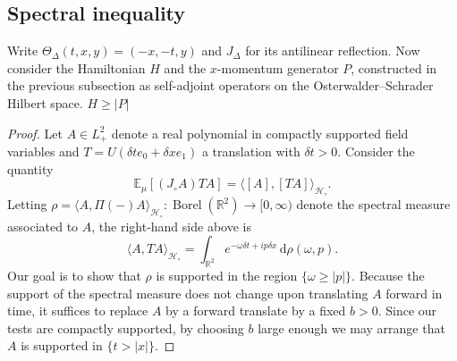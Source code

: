\documentclass[11pt, letterpaper, reqno]{amsart}
\theoremstyle{definition}
\newenvironment{proposition}
{\pushQED{\qed}\renewcommand{\qedsymbol}{$\blacksquare$}\propositionx}
{\popQED\endpropositionx}
\theoremstyle{remark}
\newcommand{\bbE}{\mathbb{E}}
\newcommand{\bbR}{\mathbb{R}}
\newcommand{\calH}{\mathcal{H}}
\newcommand{\dd}{\,\mathrm{d}}
\begin{document}
\subsection{Spectral inequality}
    Write $\Theta_\Delta(t,x,y)=(-x,-t,y)$ and $J_\Delta$ for its antilinear reflection. Now consider the Hamiltonian $H$ and the $x$-momentum generator $P$, constructed in the previous subsection as self-adjoint operators on the Osterwalder--Schrader Hilbert space. 
\begin{proposition}\label{prop:cone}
    $H\geq |P|$
\end{proposition}
\begin{proof}
    Let $A\in L_+^2$ denote a real polynomial in compactly supported field variables and $T=U(\delta t e_0+\delta x e_1)$ a translation with $\delta t>0$. Consider the quantity 
    \begin{equation}
        \bbE_\mu [(J_\circ A) T A]=\langle[A],[TA]\rangle_{\calH_\circ}.
    \end{equation}
    Letting $\rho = \langle A,  \Pi(-) A \rangle_{\calH_\circ} :\operatorname{Borel}(\bbR^2)\to [0,\infty)$ denote the spectral measure associated to $A$, the right-hand side above is 
    \begin{equation}
        \langle A,T A \rangle_{\calH_\circ} =  \int_{\bbR^2} e^{-\omega \delta t + i p \delta x} \dd \rho(\omega, p).
    \end{equation}
    Our goal is to show that $\rho$ is supported in the region $\{\omega\geq |p|\}$. Because the support of the spectral measure does not change upon translating $A$ forward in time, it suffices to replace $A$ by a 
    forward translate by a fixed $b>0$. Since our tests are compactly supported, by choosing $b$ large enough we may arrange that $A$ is supported in $\{t>|x|\}$. 


\end{proof}
\end{document}
